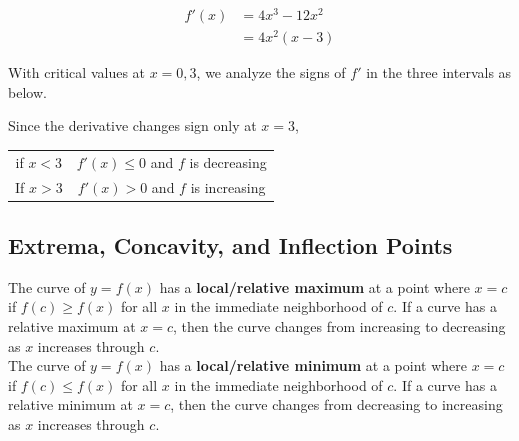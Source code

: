         \begin{align*}
            f'(x) &= 4x^3 -12x^2 \\
            &= 4x^2(x-3)
        \end{align*}

        \noindent With critical values at $x=0,3$, we analyze the signs of $f'$ in the three
        intervals as below. \\

        \begin{center}
        \end{center}

        \nonindent Since the derivative changes sign only at $x=3$,\\

        \begin{center}
            \begin{tabular}{cc}
                if $x<3$ & $f'(x)\leq 0$ and $f$ is decreasing \\
                If $x>3$ & $f'(x)> 0$ and $f$ is increasing
            \end{tabular}
        \end{center}


    \subsection{Extrema, Concavity, and Inflection Points}
        The curve of $y=f(x)$ has a \textbf{local/relative maximum} at a point where $x=c$ if
        $f(c)\geq f(x)$ for all $x$ in the immediate neighborhood of $c$. If a curve has a
        relative maximum at $x=c$, then the curve changes from increasing to decreasing as $x$
        increases through $c$. \\

        \noindent The curve of $y=f(x)$ has a \textbf{local/relative minimum} at a point where
        $x=c$ if $f(c)\leq f(x)$ for all $x$ in the immediate neighborhood of $c$.
        If a curve has a relative minimum at $x=c$, then the curve changes from decreasing to
        increasing as $x$ increases through $c$. \\

